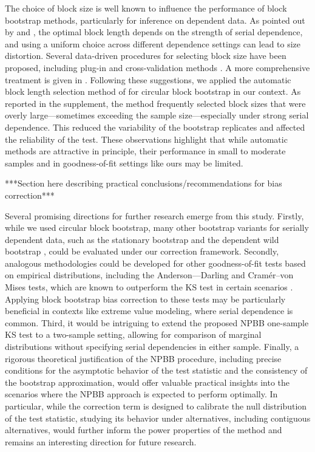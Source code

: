 \documentclass[12pt]{article}
\begin{document}
The choice of block size is well known to influence the performance of
block bootstrap methods, particularly for inference on dependent
data. As pointed out by \citet{hall1995blocking} and
\citet{lahiri1999theoretical}, the optimal block length depends on the
strength of serial dependence, and using a uniform choice across
different dependence settings can lead to size distortion. Several
data-driven procedures for selecting block size have been proposed,
including plug-in and cross-validation methods
\citep{buhlmann2002bootstraps, politis2004automatic}. A more
comprehensive treatment is given in
\citet{lahiri2013resampling}. Following these suggestions, we applied
the automatic block length selection method of
\citet{politis2004automatic} for circular block bootstrap in our
context. As reported in the supplement, the method frequently selected
block sizes that were overly large—sometimes exceeding the sample
size—especially under strong serial dependence. This reduced the
variability of the bootstrap replicates and affected the reliability
of the test. These observations highlight that while automatic methods
are attractive in principle, their performance in small to moderate
samples and in goodness-of-fit settings like ours may be limited.


***Section here describing practical conclusions/recommendations for
bias correction***


Several promising directions for further research emerge from
this study. Firstly, while we used circular block bootstrap, many
other bootstrap variants for serially dependent data, such as the
stationary bootstrap \citep{politis1994stationary} and the dependent wild
bootstrap \citep{shao2010dependent}, could be evaluated under our
correction framework. Secondly, analogous methodologies could be
developed for other goodness-of-fit tests based on empirical
distributions, including the Anderson---Darling and Cramér--von
Mises tests, which are known to outperform the KS test in certain scenarios
\citep{stephens2017tests}. Applying block bootstrap bias correction to
these tests may be particularly beneficial in contexts like extreme
value modeling, where serial dependence is common. Third, it would be
intriguing to extend the proposed NPBB
one-sample KS test to a two-sample setting, allowing for comparison of
marginal distributions without specifying serial dependencies in
either sample. Finally, a rigorous theoretical justification of the
NPBB procedure, including precise conditions for the asymptotic
behavior of the test statistic and the consistency of the bootstrap
approximation, would offer valuable practical insights into the
scenarios where the NPBB approach is expected to perform optimally.
In particular, while the
correction term is designed to calibrate the null distribution of the
test statistic, studying its behavior under alternatives, including
contiguous alternatives, would further inform the power properties of
the method and remains an interesting direction for future research.
\end{document}
